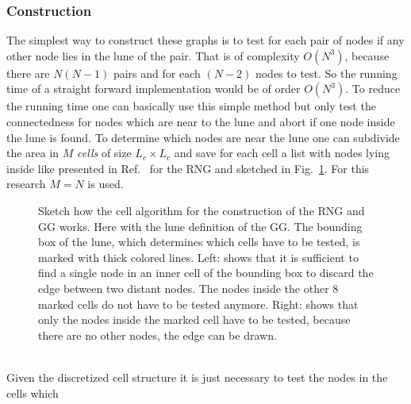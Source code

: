    \subsubsection{Construction}
        The simplest way to construct these graphs is to test for each
        pair of nodes if any other node lies in
        the lune of the pair. That is of complexity \(O (N^3)\), because
        there are \(N(N-1)\) pairs and for each \((N-2)\) nodes to test. So
        the running time of a straight forward implementation would be of
        order \(O(N^3)\).
        To reduce the running time one can basically use this simple method but only test
        the connectedness for nodes which are near to the lune and abort if
        one node inside the lune is found. To determine which nodes are
        near the lune one can subdivide the area in \(M\) \emph{cells} of size
        \(L_c \times L_c\) and save for each cell a list with nodes lying
        inside like presented in Ref.\ \cite{RNGCell} for the RNG and sketched in Fig.\ \ref{fig:cell}.
        For this research \(M = N\) is used.\\
        \begin{figure}[htbp]
            \centering
            \caption[Sketch how the Cell Method works]
            {
                Sketch how the cell algorithm for the construction of the
                RNG and GG works. Here with the lune definition of the GG.
                The bounding box of the lune, which determines which cells have
                to be tested, is marked with thick colored lines.
                Left: shows that it is sufficient to find a
                single node in an inner cell of the bounding box to discard
                the edge between two distant nodes. The nodes inside the
                other 8 marked cells do not have to be tested anymore.
                Right: shows that only the nodes inside the
                marked cell have to be tested, because there are no other nodes,
                the edge can be drawn.
            }
            \label{fig:cell}
        \end{figure}\\
        Given the discretized cell structure it is just necessary to test the nodes in the cells which
